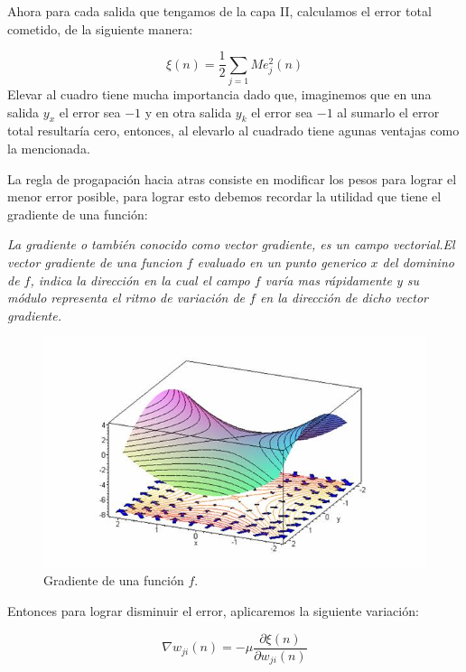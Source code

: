 \documentclass[12pt]{article}
\begin{document}
Ahora para cada salida que tengamos de la capa II, calculamos el error total cometido, de la siguiente manera:

\begin{equation} \label{eq11}
\xi (n) = \frac{1}{2} \sum_{j=1}{M}e_j^2(n)
\end{equation}
Elevar al cuadro tiene mucha importancia dado que, imaginemos que en una salida $y_x$ el error sea $-1$ y en otra salida $y_k$ el error sea $-1$ al sumarlo el error total resultaría cero, entonces, al elevarlo al cuadrado tiene agunas ventajas como la mencionada.

La regla de progapación hacia atras consiste en modificar los pesos para lograr el menor error posible,  para lograr esto debemos recordar la utilidad que tiene  el gradiente de una función:

\textit{La gradiente  o también conocido  como vector gradiente, es un campo vectorial.El vector gradiente  de una funcion $f$ evaluado en un punto generico $x$ del  dominino de $f$, indica la dirección en la cual  el campo $f$ varía mas rápidamente y su módulo representa el ritmo de variación  de $f$ en la dirección de dicho vector gradiente.}\cite{gradient}

\clearpage

\begin{figure}[h]
\includegraphics[width=\textwidth]{gradiente}
\centering
\caption{Gradiente de una función $f$.}
\label{fig:GRADIENT}
\end{figure}

Entonces para lograr disminuir el error, aplicaremos la siguiente variación:

\begin{equation} \label{eq11}
\nabla w_{ji}(n) =  -\mu \frac{\partial \xi(n)}{\partial w_{ji}(n)}
\end{equation}
\end{document}
